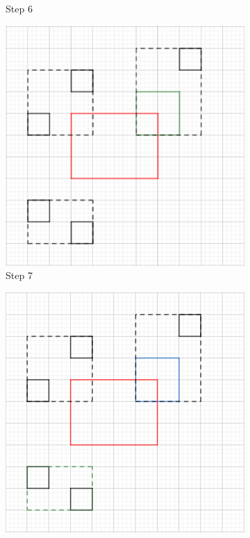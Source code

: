 \documentclass{article}
\begin{document}
\begin{figure}[h]
\begin{subfigure}{0.3\textwidth}
    \caption{Step 6}
    \centering
    \end{subfigure}
    \begin{subfigure}{0.3\textwidth}
    \includegraphics[width=\textwidth]{search/7.png}
    \caption{Step 7}
    \centering
    \end{subfigure}
    \begin{subfigure}{0.3\textwidth}
    \includegraphics[width=\textwidth]{search/8.png}

\end{subfigure}
\end{figure}
\end{document}
